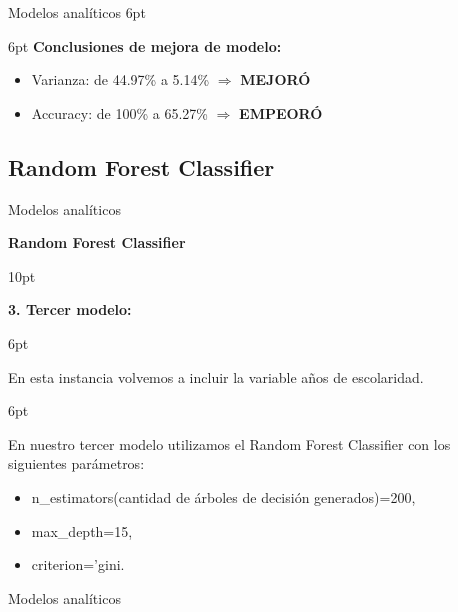 \documentclass[pdf]{beamer}
\def\vspace{}%
\begin{document}
{\begin{frame}{Modelos analíticos}
\vspace{6pt}    

%    
\vspace{6pt}
\textbf{Conclusiones de mejora de modelo:}
\begin{itemize}
    \item Varianza: de 44.97\% a 5.14\% $\Rightarrow$ \textbf{MEJORÓ}
    \item Accuracy: de 100\% a 65.27\%  $\Rightarrow$ \textbf{EMPEORÓ}
\end{itemize}

\end{frame}

    \subsection{Random Forest Classifier}

\begin{frame}{Modelos analíticos}

    
    \begin{Large}
        \textbf{Random Forest Classifier}
    \end{Large}

\vspace{10pt}

    \textbf{3. Tercer modelo:}
    
\vspace{6pt}

    En esta instancia volvemos a incluir la variable años de escolaridad.
    
\vspace{6pt}

    En nuestro tercer modelo utilizamos el Random Forest Classifier con los siguientes parámetros:
    \begin{itemize}
        \item n\_estimators(cantidad de árboles de decisión generados)=200,
        \item max\_depth=15,
        \item criterion='gini.
    \end{itemize}

\end{frame}

\begin{frame}{Modelos analíticos}


\end{frame}}
\end{document}
